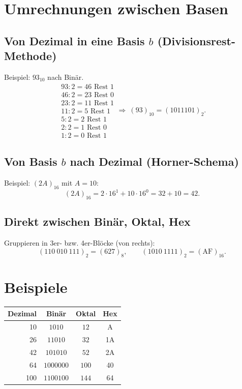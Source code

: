 \documentclass[../skript/main.tex]{subfiles}
\begin{document}
\section{Umrechnungen zwischen Basen}
\subsection*{Von Dezimal in eine Basis \(b\) (Divisionsrest-Methode)}
Beispiel: \(93_{10}\) nach Binär.
\[
\begin{array}{r|l}
	93:2 = 46 \text{ Rest }1\\
	46:2 = 23 \text{ Rest }0\\
	23:2 = 11 \text{ Rest }1\\
	11:2 = 5  \text{ Rest }1\\
	5:2  = 2  \text{ Rest }1\\
	2:2  = 1  \text{ Rest }0\\
	1:2  = 0  \text{ Rest }1
\end{array}
\Rightarrow\ (93)_{10} = (1011101)_2.
\]

\subsection*{Von Basis \(b\) nach Dezimal (Horner-Schema)}
Beispiel: \((2A)_{16}\) mit \(A=10\):
\[
(2A)_{16} = 2\cdot 16^1 + 10\cdot 16^0 = 32 + 10 = 42.
\]

\subsection*{Direkt zwischen Binär, Oktal, Hex}
Gruppieren in 3er- bzw. 4er-Blöcke (von rechts):
\[
(110\ 010\ 111)_2 = (627)_8,\qquad
(1010\ 1111)_2 = (\text{AF})_{16}.
\]

\section{Beispiele}
\begin{center}
	\begin{tabular}{r|c|c|c}
		\textbf{Dezimal} & \textbf{Binär} & \textbf{Oktal} & \textbf{Hex} \\
		\hline
		10 & \(1010\) & \(12\) & A \\
		26 & \(11010\) & \(32\) & 1A \\
		42 & \(101010\) & \(52\) & 2A \\
		64 & \(1000000\) & \(100\) & 40 \\
		100 & \(1100100\) & \(144\) & 64 \\
	\end{tabular}
\end{center}
\end{document}
